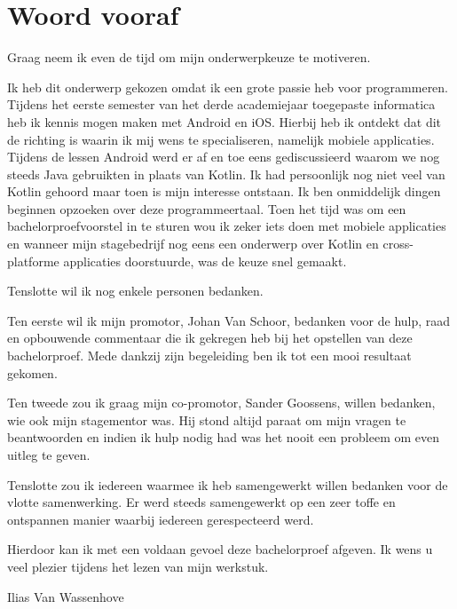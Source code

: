 
\chapter*{Woord vooraf}
\label{ch:voorwoord}

Graag neem ik even de tijd om mijn onderwerpkeuze te motiveren.

Ik heb dit onderwerp gekozen omdat ik een grote passie heb voor programmeren. Tijdens het eerste semester van het derde academiejaar toegepaste informatica heb ik kennis mogen maken met Android en iOS. Hierbij heb ik ontdekt dat dit de richting is waarin ik mij wens te specialiseren, namelijk mobiele applicaties. Tijdens de lessen Android werd er af en toe eens gediscussieerd waarom we nog steeds Java gebruikten in plaats van Kotlin. Ik had persoonlijk nog niet veel van Kotlin gehoord maar toen is mijn interesse ontstaan. Ik ben onmiddelijk dingen beginnen opzoeken over deze programmeertaal. Toen het tijd was om een bachelorproefvoorstel in te sturen wou ik zeker iets doen met mobiele applicaties en wanneer mijn stagebedrijf nog eens een onderwerp over Kotlin en cross-platforme applicaties doorstuurde, was de keuze snel gemaakt.

Tenslotte wil ik nog enkele personen bedanken.

Ten eerste wil ik mijn promotor, Johan Van Schoor, bedanken voor de hulp, raad en opbouwende commentaar die ik gekregen heb bij het opstellen van deze bachelorproef. Mede dankzij zijn begeleiding ben ik tot een mooi resultaat gekomen.

Ten tweede zou ik graag mijn co-promotor, Sander Goossens, willen bedanken, wie ook mijn stagementor was. Hij stond altijd paraat om mijn vragen te beantwoorden en indien ik hulp nodig had was het nooit een probleem om even uitleg te geven.

Tenslotte zou ik iedereen waarmee ik heb samengewerkt willen bedanken voor de vlotte samenwerking. Er werd steeds samengewerkt op een zeer toffe en ontspannen manier waarbij iedereen gerespecteerd werd.

Hierdoor kan ik met een voldaan gevoel deze bachelorproef afgeven. Ik wens u veel plezier tijdens het lezen van mijn werkstuk.

Ilias Van Wassenhove


